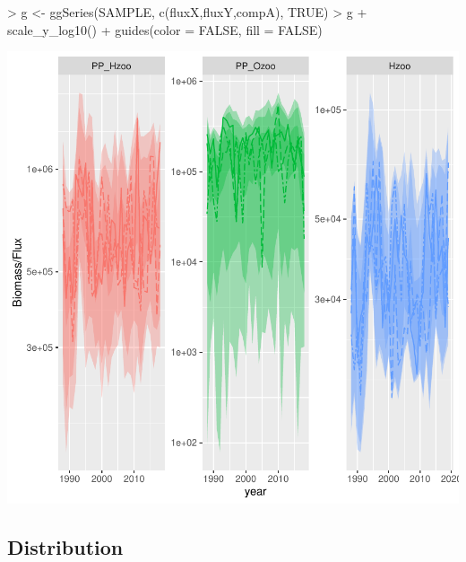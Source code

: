 \documentclass{article}
\begin{document}
\begin{Schunk}
\begin{Sinput}
> g <- ggSeries(SAMPLE, c(fluxX,fluxY,compA), TRUE)
> g + scale_y_log10() + guides(color = FALSE, fill = FALSE)
\end{Sinput}
\end{Schunk}
\includegraphics{barents_SM-017}


\clearpage

\subsection{Distribution}
\end{document}
